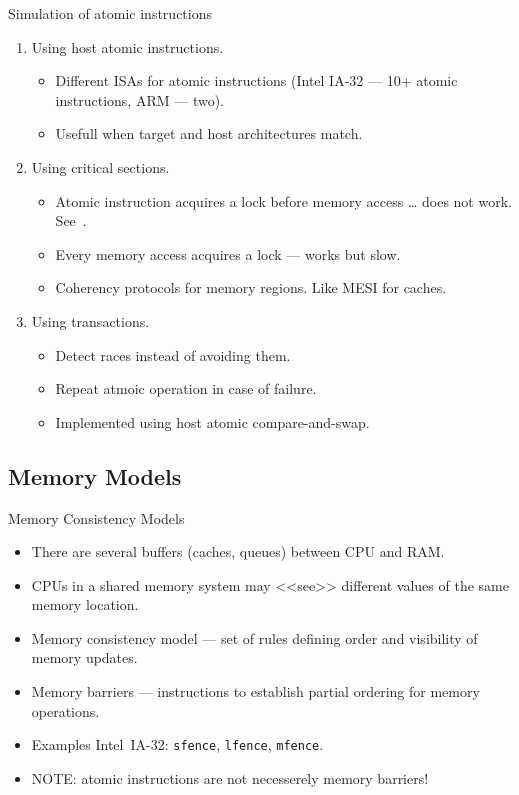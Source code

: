 \begin{frame}{Simulation of atomic instructions}
  \begin{enumerate}
    \item Using host atomic instructions.
    \begin{itemize}
      \item Different ISAs for atomic instructions (Intel IA-32 --- 10+ atomic
        instructions, ARM --- two).
      \item Usefull when target and host architectures match. \pause
    \end{itemize}
    \item Using critical sections.
    \begin{itemize}
      \item Atomic instruction acquires a lock before memory access \pause
        \dots{} does not work. See~\cite{coremu}.
      \item Every memory access acquires a lock --- works but slow. \pause
      \item Coherency protocols for memory regions. Like MESI for caches. \pause
    \end{itemize}
    \item Using transactions.
    \begin{itemize}
      \item Detect races instead of avoiding them.
      \item Repeat atmoic operation in case of failure.
      \item Implemented using host atomic compare-and-swap.
    \end{itemize}
  \end{enumerate}
\end{frame}

\subsection{Memory Models}

\begin{frame}{Memory Consistency Models}
  \begin{itemize}
    \item There are several buffers (caches, queues) between CPU and RAM.
    \item CPUs in a shared memory system may <<see>> different values of the
      same memory location.
    \item Memory consistency model --- set of rules defining order and
      visibility of memory updates.
    \pause
    \vfill
    \item Memory barriers --- instructions to establish partial ordering for
      memory operations.
    \item Examples Intel\reg~IA-32: \texttt{sfence}, \texttt{lfence},
      \texttt{mfence}.
    \item NOTE: atomic instructions are not necesserely memory barriers!
  \end{itemize}
\end{frame}

